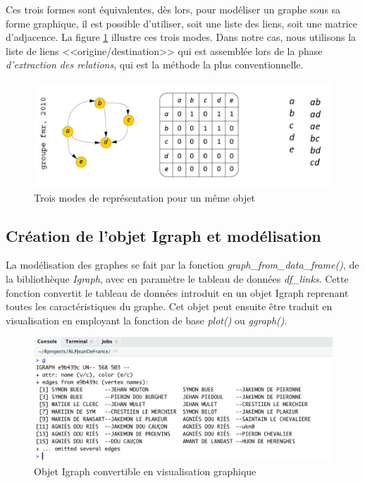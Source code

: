 Ces trois formes sont équivalentes, dès lors, pour modéliser un graphe sous sa forme graphique, il est possible d'utiliser, soit une liste des liens, soit une matrice d'adjacence. La figure \ref{fig:representation_graphes} illustre ces trois modes. Dans notre cas, nous utilisons la liste de liens  <<origine/destination>> qui est assemblée lors de la phase \textit{d'extraction des relations}, qui est la méthode la plus conventionnelle.
\begin{figure}
    \centering
    \includegraphics[scale=0.75]{3.Results/Img/mode_de_representation_graphes.png}
    \caption{Trois modes de représentation pour un même objet}
    \label{fig:representation_graphes}
\end{figure}

\subsection{Création de l'objet Igraph et modélisation}
La modélisation des graphes se fait par la fonction  \textit{graph\_from\_data\_frame()}, de la bibliothèque \textit{Igraph}, avec en paramètre le tableau de données \textit{df\_links}.
Cette fonction convertit le tableau de données introduit  en un objet Igraph  reprenant toutes les caractéristiques du graphe. Cet objet peut ensuite être traduit en visualisation en employant la fonction de base \textit{plot()} ou \textit{ggraph()}.

\begin{figure}[h]
    \centering
    \includegraphics[scale=0.50]{3.Results/Img/igraph_object.png}
    \caption{Objet Igraph convertible en visualisation graphique}
    \label{fig:objetIgraph}
\end{figure}


